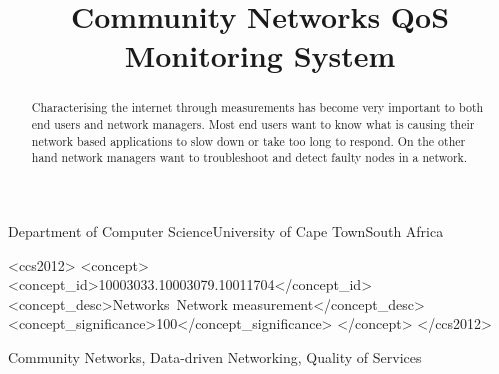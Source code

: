 \documentclass[plain]{sigplanconf}
\begin{document}
	\title{Community Networks QoS Monitoring System}

	{Department of Computer Science\linebreak University of Cape Town\linebreak South Africa}
	{}
	\maketitle
	\begin{abstract}
	\paragraph{}
	Characterising the internet through measurements has
	become very important to both end users and network
	managers. Most end users want to know what is causing their network based applications to slow down or take too long to respond. On the other hand network managers want to troubleshoot and detect faulty nodes in a network.
	\paragraph{}
	
	\end{abstract}
	\begin{CCSXML}
		<ccs2012>
		<concept>
		<concept_id>10003033.10003079.10011704</concept_id>
		<concept_desc>Networks~Network measurement</concept_desc>
		<concept_significance>100</concept_significance>
		</concept>
		</ccs2012>
	\end{CCSXML}
	\keywords
	Community Networks, Data-driven Networking, Quality of Services
	






	
	
%	
\end{document}
